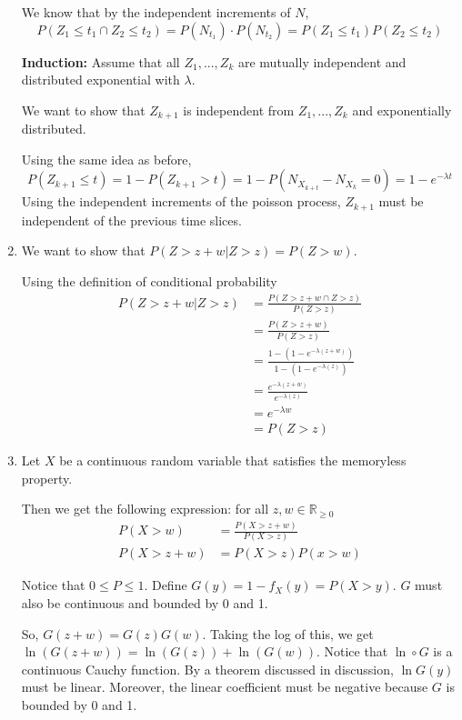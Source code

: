 \documentclass[12pt]{article}
\begin{document}
\begin{enumerate}[start=1,label={\bfseries Problem \arabic*:},leftmargin=1in]
    We know that by the independent increments of $N$, 
     \[ P(Z_{1} \leq t_{1} \cap Z_{2} \leq t_{2}) = P(N_{t_{1}}) \cdot P(N_{{t_{2}}}) = P(Z_{1} \leq t_{1}) P(Z_{2} \leq t_{2})
      \]

    \textbf{Induction:} Assume that all $Z_{1}, ..., Z_{k}$ are mutually independent and distributed exponential with $\lambda$. 
    
    We want to show that $Z_{k+1}$ is independent from $Z_{1}, ..., Z_{k}$ and exponentially distributed. 
    
    Using the same idea as before, 
    \[ 
        P(Z_{k+1} \leq t) = 1- P(Z_{k+1} > t)  = 1 - P(N_{X_{k + t}} - N_{X_{k}} = 0) = 1- e^{-\lambda t }
    \]
    Using the independent increments of the poisson process, $Z_{k+1}$ must be independent of the previous time slices. 

    \item We want to show that $P(Z > z + w | Z > z) = P(Z > w)$. 
    
    Using the definition of conditional probability 
    \begin{align*}
        P(Z > z + w | Z > z) &= \frac{P(Z > z + w \cap Z > z)}{P(Z > z)}\\ 
        &=\frac{P(Z > z + w)}{P(Z > z)}\\ 
        &= \frac{1 - (1 - e^{-\lambda (z+w)})}{1 - (1 - e^{-\lambda (z)})}\\ 
        &= \frac{e^{-\lambda (z+w)}}{e^{-\lambda (z)}}\\ 
        &= e^{-\lambda w}\\
        &= P(Z > z)
    \end{align*}

    \item Let $X$ be a continuous random variable that satisfies the memoryless property. 
    
    Then we get the following expression: for all $z, w \in \mathbb{R}_{\geq 0}$
    \begin{align*}
        P(X > w) &= \frac{P(X > z + w)}{P(X > z)} \\ 
        P(X > z + w) &= P(X > z)P(x > w)
    \end{align*}

    Notice that $0 \leq P \leq 1$. Define $G(y) = 1 - f_{X}(y) = P(X > y)$. $G$ must also be continuous and bounded by 0 and 1. 

    So, $G(z + w) = G(z)G(w)$. Taking the log of this, we get $\ln (G(z + w)) = \ln (G(z)) + \ln(G(w))$. 
    Notice that $\ln \circ G$ is a continuous Cauchy function. By a theorem discussed in discussion, $\ln G(y)$ must be linear. Moreover, the linear coefficient must be negative because $G$ is bounded by 0 and 1. 


\end{enumerate}
\end{document}
